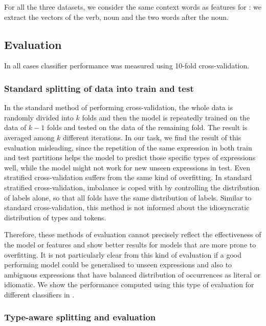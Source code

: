 \documentclass[output=paper,modfonts,nonflat]{langsci/langscibook}
\begin{document}
For all the three datasets, we consider the same context words as features for : we extract the vectors of the verb, noun and the two words after the noun. 

\subsection{Evaluation}

In all cases classifier performance was measured using 10-fold cross-validation.

\subsubsection{Standard splitting of data into train and test}
In the standard method of performing cross-validation, the whole data is randomly divided into $k$ folds and then the model is repeatedly trained on the data of $k-1$ folds and tested on the data of the remaining fold. The result is averaged among $k$ different iterations. In our task, we find the result of this evaluation misleading, since the repetition of the same expression in both train and test partitions helps the model to predict those specific types of expressions well, while the model might not work for new unseen expressions in test. Even stratified cross-validation suffers from the same kind of overfitting. In standard stratified cross-validation, imbalance is coped with by controlling the distribution of labels alone, so that all folds have the same distribution of labels. Similar to standard cross-validation, this method is not informed about the idiosyncratic distribution of types and tokens.

Therefore, these methods of evaluation cannot precisely reflect the effectiveness of the model or features and show better results for models that are more prone to overfitting. It is not particularly clear from this kind of evaluation if a good performing model could be generalised to unseen expressions and also to ambiguous expressions that have balanced distribution of occurrences as literal or idiomatic.
We show the performance computed using this type of evaluation for different classifiers in .


\subsubsection{Type-aware splitting and evaluation}
\end{document}
